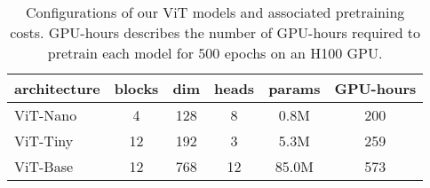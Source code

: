 \begin{table}[!t]\centering
    \scriptsize
    \caption{Configurations of our ViT models and associated pretraining costs. GPU-hours describes the number of GPU-hours required to pretrain each model for $500$ epochs on an H100 GPU.}
    \label{tab:size_cost}
    {\begin{tabular}{lccccc}
       architecture & blocks & dim & heads & params & GPU-hours \\
         \toprule
         ViT-Nano & 4 & 128 & 8 & 0.8M & 200 \\
         ViT-Tiny & 12 & 192 & 3 & 5.3M & 259 \\
         ViT-Base & 12 & 768 & 12 & 85.0M & 573 \\
    \end{tabular}}
\end{table}
